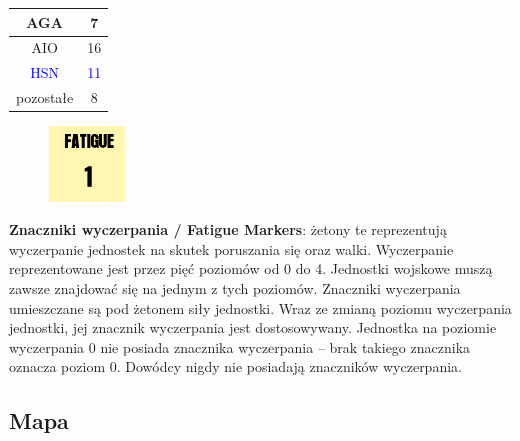 \documentclass[10pt,twoside,a4paper,table]{article}
\begin{document}
\begin{multicols*}{2}
\begin{center}
\begin{tabular}{ |c|c| }
			\hline
			AGA                            & 7                                             \\
			\hline
			AIO                            & 16                                            \\
			\hline
			\textcolor{blue}{HSN}          & \textcolor{blue}{11}                          \\
			\hline
			pozostałe                     & 8                                             \\
			\hline
		\end{tabular}
	\end{center}
				
	\begin{figure}
		\includegraphics[width=2cm, height=2cm]{fatigue.png} 
	\end{figure}
	\textbf{Znaczniki wyczerpania / Fatigue Markers}: żetony te reprezentują wyczerpanie jednostek na skutek poruszania się oraz walki. Wyczerpanie reprezentowane jest przez pięć poziomów od 0 do 4. Jednostki wojskowe muszą zawsze znajdować się na jednym z tych poziomów. Znaczniki wyczerpania umieszczane są pod żetonem siły jednostki. Wraz ze zmianą poziomu wyczerpania jednostki, jej znacznik wyczerpania jest dostosowywany. Jednostka na poziomie wyczerpania 0 nie posiada znacznika wyczerpania -- brak takiego znacznika oznacza poziom 0. Dowódcy nigdy nie posiadają znaczników wyczerpania.
	\subsection{Mapa}

\end{multicols*}
\end{document}
